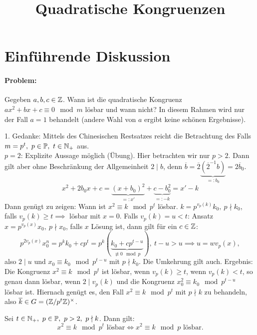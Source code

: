 \documentclass[a4paper,DIV15,BCOR12mm]{article}
\title{Quadratische Kongruenzen}
\begin{document}
\maketitle
\section{Einführende Diskussion}
\paragraph{Problem:} Gegeben $a,b,c \in \mathbb{Z}$. Wann ist die
quadratische Kongruenz $ax^2+bx+c \equiv 0 \mod m$ lösbar und wann
nicht? In diesem Rahmen wird nur der Fall $a=1$ behandelt (andere
Wahl von $a$ ergibt keine schönen Ergebnisse).

1. Gedanke: Mittels des Chinesischen Restsatzes reicht die
Betrachtung des Falls $m=p^t,\ p\in \MdP,\ t\in \MdN_+$ aus.\\
$p=2$: Explizite Aussage möglich (Übung). Hier betrachten wir nur
$p>2$. Dann gilt aber ohne Beschränkung der Allgemeinheit $2 \mid
b$, denn $\overline b=\overline 2 \underbrace{(\overline
2^{-1}b)}_{=: b_0} =2\overline b_0$.\\
\[
    x^2+2b_0x+c=\underbrace{(x+b_0)^2}_{=:x'}+\underbrace{c-b_0^2}_{=:-k}=x'-k
\]
Dann genügt zu zeigen: Wann ist $x^2\equiv k \mod p^t$ lösbar.
$k=p^{v_p(k)} k_0,\ p \nmid k_0$, falls $v_p(k)\geq t \implies$
lösbar mit $x=0$. Falls $v_p(k)=u < t$: Ansatz $x=p^{v_p(x)}x_0,\ p
\nmid x_0$, falls $x$ Lösung ist, dann gilt für ein $c\in \mathbb{Z}$:
\[
    p^{2v_p(x)} x_0^n=p^k k_0 + c
    p^t=p^k(\underbrace{k_0+cp^{t-u}}_{\not \equiv 0 \mod p}),\
    t-u>u \implies u=w v_p(x),
\]
also $2\mid u$ und $x_0 \equiv k_0 \mod p^{t-u}$ mit $p \nmid k_0$.
Die Umkehrung gilt auch. Ergebnis: Die Kongruenz $x^2 \equiv k \mod
p^t$ ist lösbar, wenn $v_p(k)\geq t$, wenn $v_p(k) < t$, so genau
dann lösbar, wenn $2 \mid v_p(k)$ und die Kongruenz $x_0^2 \equiv
k_0 \mod p^{t-u}$ lösbar ist. Hiernach genügt es, den Fall $x^2
\equiv k \mod p^t$ mit $p\nmid k$ zu behandeln, also $\overline k
\in G=(\mathbb{Z}/p^t\mathbb{Z})^{\times}$.
\begin{hilfssatz}
    Sei $t \in \mathbb{N}_+,\ p \in \mathbb{P},\ p>2,\ p \nmid k$. Dann gilt:
    \[
        x^2\equiv k \mod p^t \text{ lösbar} \iff x^2 \equiv k \mod p
        \text{ lösbar}.
    \]
\end{hilfssatz}
\end{document}
